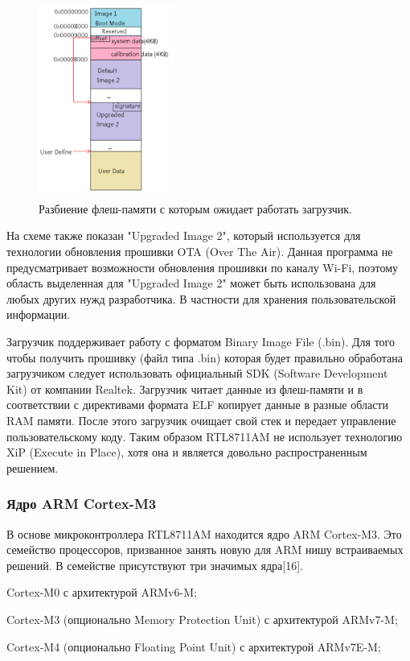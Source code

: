\begin{figure}[h!]
    \centering
    \includegraphics[width=0.4\textwidth]{rtl8711am_flash_layout.png}
    \caption{Разбиение флеш-памяти с которым ожидает работать загрузчик.}
\end{figure}

На схеме также показан "Upgraded Image 2", который используется для технологии обновления прошивки OTA (Over The Air). Данная программа не предусматривает возможности обновления прошивки по каналу Wi-Fi, поэтому область выделенная для "Upgraded Image 2" может быть использована для любых других нужд разработчика. В частности для хранения пользовательской информации.


Загрузчик поддерживает работу с форматом Binary Image File (.bin). Для того чтобы получить прошивку (файл типа .bin) которая будет правильно обработана загрузчиком следует использовать официальный SDK (Software Development Kit) от компании Realtek. Загрузчик читает данные из флеш-памяти и в соответствии с директивами формата ELF копирует данные в разные области RAM памяти. После этого загрузчик очищает свой стек и передает управление пользовательскому коду. Таким образом RTL8711AM не использует технологию XiP (Execute in Place), хотя она и является довольно распространенным решением.

\subsubsection{ Ядро ARM Cortex-M3}
В основе микроконтроллера RTL8711AM находится ядро ARM Cortex-M3. Это семейство процессоров, призванное занять новую для ARM нишу встраиваемых решений. В семействе присутствуют три значимых ядра[16].

\begin{my_enumerate}
\item Cortex-M0 с архитектурой ARMv6-M;
\item Cortex-M3 (опционально Memory Protection Unit) с архитектурой ARMv7-M;
\item Cortex-M4 (опционально Floating Point Unit) с архитектурой ARMv7E-M;
\end{my_enumerate}

